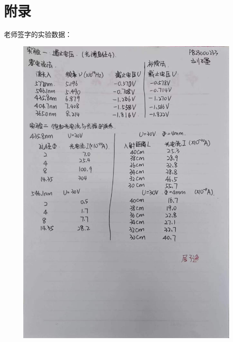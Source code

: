\documentclass[a4paper]{extarticle}
\begin{document}
    \section*{附录}
    老师签字的实验数据：
    \begin{figure}[H]
        \centering
        \includegraphics[width=0.98\linewidth]{shuju.jpg}
    \end{figure}
\end{document}
